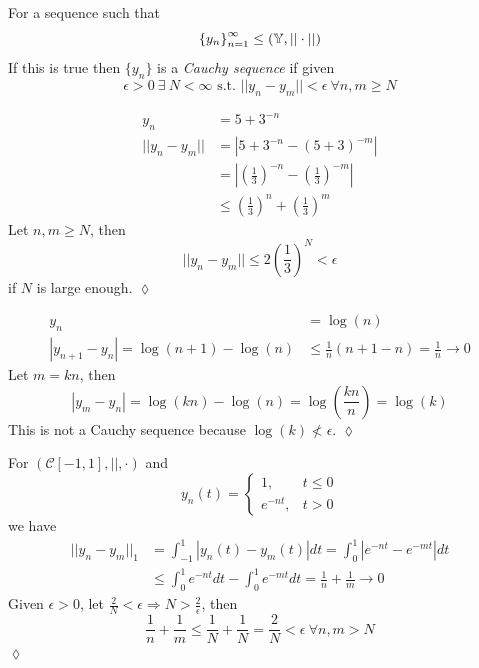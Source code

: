 \begin{definition}
For a sequence such that
$${\{y_n\}}_{n=1}^\infty \leq (\mathbb{Y},||\cdot||)$$
If this is true then $\{y_n\}$ is a \textit{Cauchy sequence} if given
$$\epsilon>0~\exists~N<\infty \text{~s.t.~} ||y_n-y_m||<\epsilon~\forall n,m\geq N$$
\end{definition}

\begin{example}
\begin{align*}
y_n &= 5+3^{-n} \\
||y_n-y_m|| &= |5+3^{-n}-{(5+3)}^{-m}| \\
&= \left|{\left(\frac{1}{3}\right)}^{-n} - {\left(\frac{1}{3}\right)}^{-m}\right| \\
&\leq {\left(\frac{1}{3}\right)}^n + {\left(\frac{1}{3}\right)}^m
\end{align*}
Let $n,m\geq N$, then
$$||y_n-y_m|| \leq 2{\left(\frac{1}{3}\right)}^N < \epsilon$$
if $N$ is large enough.
$\lozenge$
\end{example}

\begin{example}
\begin{align*}
y_n &= \log(n) \\
|y_{n+1}-y_n| = \log(n+1)-\log(n) &\leq \frac{1}{n}(n+1-n) = \frac{1}{n}\to 0
\end{align*}
Let $m=kn$, then
$$|y_m-y_n| = \log(kn)-\log(n) = \log\left(\frac{kn}{n}\right) = \log(k)$$
This is not a Cauchy sequence because $\log(k)\nless\epsilon$.
$\lozenge$
\end{example}

\begin{example}
\label{ex:1norm}
For $(\mathcal{C}[-1,1],||,\cdot)$ and
$$y_n(t) = \begin{cases} 1, & t\leq 0 \\ e^{-nt}, & t>0 \end{cases}$$
we have
\begin{align*}
||y_n-y_m||_1 &= \int_{-1}^1|y_n(t)-y_m(t)|dt = \int_0^1|e^{-nt}-e^{-mt}|dt \\
&\leq \int_0^1e^{-nt}dt - \int_0^1e^{-mt}dt = \frac{1}{n} + \frac{1}{m} \to 0
\end{align*}
Given $\epsilon>0$, let $\frac{2}{N}<\epsilon\Rightarrow N>\frac{2}{\epsilon}$, then
$$\frac{1}{n} + \frac{1}{m}\leq \frac{1}{N}+\frac{1}{N} = \frac{2}{N}<\epsilon~\forall n,m>N$$
$\lozenge$
\end{example}

